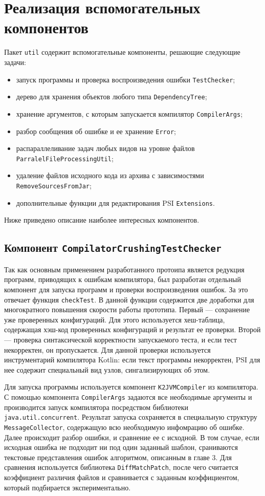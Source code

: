 \section{Реализация вспомогательных компонентов}
Пакет \texttt{util} содержит вспомогательные компоненты, решающие следующие задачи:
\begin{itemize}
	\item запуск программы и проверка воспроизведения ошибки \texttt{TestChecker};
	\item дерево для хранения объектов любого типа \texttt{DependencyTree};
	\item хранение аргументов, с которым запускается компилятор \texttt{CompilerArgs};
	\item разбор сообщения об ошибке и ее хранение \texttt{Error};
	\item распараллеливание задач любых видов на уровне файлов \texttt{ParralelFileProcessingUtil};
	\item удаление файлов исходного кода из архива с зависимостями \texttt{RemoveSourcesFromJar};
	\item дополнительные функции для редактирования PSI \texttt{Extensions}.
\end{itemize}
Ниже приведено описание наиболее интересных компонентов.

\subsection{Компонент \texttt{CompilatorCrushingTestChecker}}
Так как основным применением разработанного протоипа является редукция программ, приводящих к ошибкам компилятора, был разработан отдельный компонент для запуска программ и проверки воспроизведения ошибок. За это отвечает функция \texttt{checkTest}. В данной функции содержится две доработки для многократного повышения скорости работы прототипа. Первый --- сохранение уже проверенных конфигураций. Для этого используется хеш-таблица, содержащая хэш-код проверенных конфигураций и результат ее проверки. Второй --- проверка синтаксической корректности запускаемого теста, и если тест некорректен, он пропускается. Для данной проверки используется инструментарий компилятора Kotlin: если текст программы некорректен, PSI для нее содержит специальный вид узлов, сингализирующих об этом. 

Для запуска программы используется компонент \texttt{K2JVMCompiler} из компилятора. С помощью компонента \texttt{CompilerArgs} задаются все необходимые аргументы и производится запуск компилятора посредством библиотеки \texttt{java.util.concurrent}. Результат запуска сохраняется в специальную структуру \texttt{MessageCollector}, содержащую всю необходимую инфомрацию об ошибке. Далее происходит разбор ошибки, и сравнение ее с исходной. В том случае, если исходная ошибка не подходит ни под один заданный шаблон, сраниваются текстовые представления ошибок алгоритмом, описанным в главе 3. Для сравнения используется библиотека \texttt{DiffMatchPatch}, после чего считается коэффициент различия файлов и сравнивается с заданным коэффициентом, который подбирается экспериментально. 


